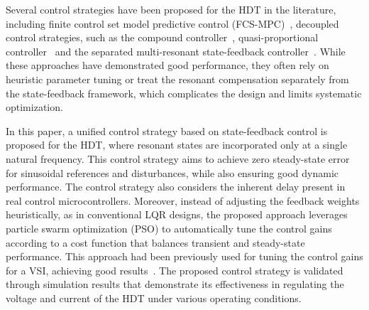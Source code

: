 Several control strategies have been proposed for the HDT in the literature, including finite control set model predictive control (FCS-MPC)~\cite{costaFourlegMatrixConverter2022}, decoupled control strategies, such as the compound controller~\cite{liuCompoundControlSystem2020}, quasi-proportional controller~\cite{liuQuasiProportionalResonantControlHybrid2022} and the separated multi-resonant state-feedback controller~\cite{carrenoStateFeedbackControlHybrid2024}. While these approaches have demonstrated good performance, they often rely on heuristic parameter tuning or treat the resonant compensation separately from the state-feedback framework, which complicates the design and limits systematic optimization.

In this paper, a unified control strategy based on state-feedback control is proposed for the HDT, where resonant states are incorporated only at a single natural frequency. This control strategy aims to achieve zero steady-state error for sinusoidal references and disturbances, while also ensuring good dynamic performance. The control strategy also considers the inherent delay present in real control microcontrollers. Moreover, instead of adjusting the feedback weights heuristically, as in conventional LQR designs, the proposed approach leverages particle swarm optimization (PSO) to automatically tune the control gains according to a cost function that balances transient and steady-state performance. This approach had been previously used for tuning the control gains for a VSI, achieving good results~\cite{ufnalskiParticleSwarmOptimization2015,galcckiParticleSwarmOptimization2018}. The proposed control strategy is validated through simulation results that demonstrate its effectiveness in regulating the voltage and current of the HDT under various operating conditions.
